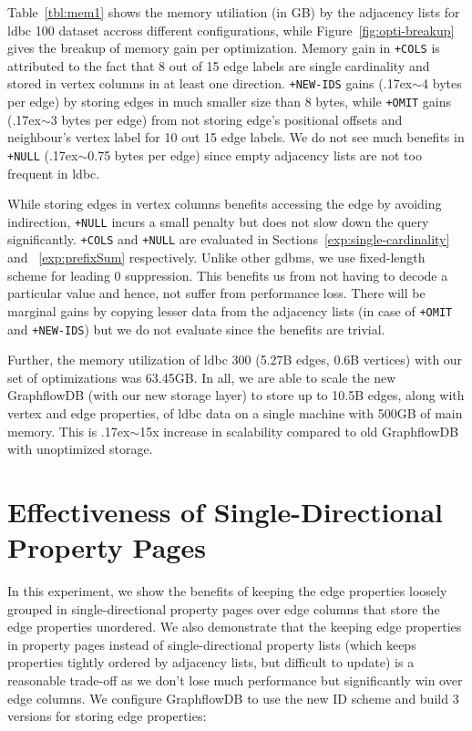 Table~\ref{tbl:mem1} shows the memory utiliation (in GB) by the adjacency lists for \gls{ldbc} 100 dataset accross different configurations, while Figure~\ref{fig:opti-breakup} gives the breakup of memory gain per optimization. Memory gain in \texttt{+COLS} is attributed to the fact that 8 out of 15 edge labels are single cardinality and stored in vertex columns in at least one direction. \texttt{+NEW-IDS} gains ({\raise.17ex\hbox{$\scriptstyle\sim$}}4 bytes per edge) by storing edges in much smaller size than 8 bytes, while \texttt{+OMIT} gains ({\raise.17ex\hbox{$\scriptstyle\sim$}}3 bytes per edge) from not storing edge's positional offsets and neighbour's vertex label for 10 out 15 edge labels. We do not see much benefits in \texttt{+NULL} ({\raise.17ex\hbox{$\scriptstyle\sim$}}0.75 bytes per edge) since empty adjacency lists are not too frequent in \gls{ldbc}. 

While storing edges in vertex columns benefits accessing the edge by avoiding indirection, \texttt{+NULL} incurs a small penalty but does not slow down the query significantly. \texttt{+COLS} and \texttt{+NULL} are evaluated in Sections~\ref{exp:single-cardinality} and ~\ref{exp:prefixSum} respectively. Unlike other \gls{gdbms}, we use fixed-length scheme for leading 0 suppression. This benefits us from not having to decode a particular value and hence, not suffer from performance loss. There will be marginal gains by copying lesser data from the adjacency lists (in case of \texttt{+OMIT} and \texttt{+NEW-IDS}) but we do not evaluate since the benefits are trivial.

Further, the memory utilization of \gls{ldbc} 300 (5.27B edges, 0.6B vertices) with our set of optimizations was 63.45GB. In all, we are able to scale the new GraphflowDB (with our new storage layer) to store up to 10.5B edges, along with vertex and edge properties, of \gls{ldbc} data on a single machine with 500GB of main memory. This is {\raise.17ex\hbox{$\scriptstyle\sim$}}15x increase in scalability compared to old GraphflowDB with unoptimized storage.

\section{Effectiveness of Single-Directional Property Pages}
\label{exp:property-pages}

In this experiment, we show the benefits of keeping the edge properties loosely grouped in single-directional property pages over edge columns that store the edge properties unordered. We also demonstrate that the keeping edge properties in property pages instead of single-directional property lists (which keeps properties tightly ordered by adjacency lists, but difficult to update) is a reasonable trade-off as we don't lose much performance but significantly win over edge columns. We configure  GraphflowDB to use the new ID scheme and build 3 versions for storing edge properties:

